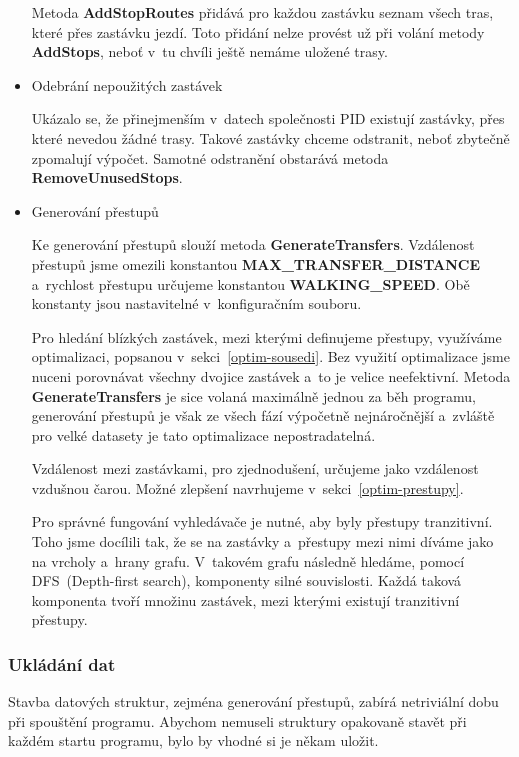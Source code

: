 \begin{itemize}
    Metoda \textbf{AddStopRoutes} přidává pro každou zastávku seznam všech tras, které přes zastávku jezdí. Toto přidání nelze provést už při volání metody \textbf{AddStops}, neboť v~tu chvíli ještě nemáme uložené trasy.
    
    \item Odebrání nepoužitých zastávek
    
    Ukázalo se, že přinejmenším v~datech společnosti PID existují zastávky, přes které nevedou žádné trasy. Takové zastávky chceme odstranit, neboť zbytečně zpomalují výpočet. Samotné odstranění obstarává metoda \textbf{RemoveUnusedStops}.
    
    \item Generování přestupů\label{generovani-prestupu}
    
    Ke generování přestupů slouží metoda \textbf{GenerateTransfers}. Vzdálenost přestupů jsme omezili konstantou \textbf{MAX\_TRANSFER\_DISTANCE} a~rychlost přestupu určujeme konstantou \textbf{WALKING\_SPEED}. Obě konstanty jsou nastavitelné v~konfiguračním souboru.
    
    Pro hledání blízkých zastávek, mezi kterými definujeme přestupy, využíváme optimalizaci, popsanou v~sekci~\ref{optim-sousedi}. Bez využití optimalizace jsme nuceni porovnávat všechny dvojice zastávek a~to je velice neefektivní. Metoda \textbf{GenerateTransfers} je sice volaná maximálně jednou za běh programu, generování přestupů je však ze všech fází výpočetně nejnáročnější a~zvláště pro velké datasety je tato optimalizace nepostradatelná.
    
    Vzdálenost mezi zastávkami, pro zjednodušení, určujeme jako vzdálenost vzdušnou čarou. Možné zlepšení navrhujeme v~sekci~\ref{optim-prestupy}.
    
    Pro správné fungování vyhledávače je nutné, aby byly přestupy tranzitivní. Toho jsme docílili tak, že se na zastávky a~přestupy mezi nimi díváme jako na vrcholy a~hrany grafu. V~takovém grafu následně hledáme, pomocí DFS~(Depth-first search), komponenty silné souvislosti. Každá taková komponenta tvoří množinu zastávek, mezi kterými existují tranzitivní přestupy.
\end{itemize}

\subsubsection{Ukládání dat}

Stavba datových struktur, zejména generování přestupů, zabírá netriviální dobu při spouštění programu. Abychom nemuseli struktury opakovaně stavět při každém startu programu, bylo by vhodné si je někam uložit.

